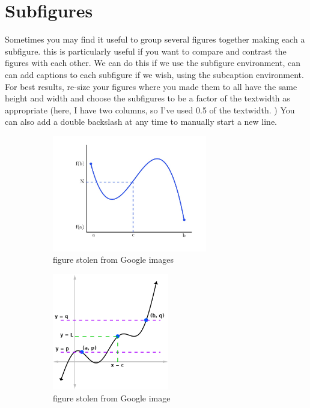 \documentclass[a4paper,11pt]{article}
\begin{document}
\section{Subfigures}

Sometimes you may find it useful to group several figures together making each a subfigure. this is particularly useful if you want to compare and contrast the figures with each other. We can do this if we use the subfigure environment, can can add captions to each subfigure if we wish, using the subcaption environment. For best results, re-size your figures where you made them to all have the same height and width and choose the subfigures to be a factor of the textwidth as appropriate (here, I have two columns, so I've used 0.5 of the textwidth. ) You can also add a double backslash at any time to manually start a new line.
%
\begin{figure}[htpb]
\begin{subfigure}{.5\textwidth}
  \centering
  \includegraphics[height=2in]{ivt}
  \caption{figure stolen from Google images} %
  \label{fig:IVTgoogleA}  		%
\end{subfigure}
\begin{subfigure}{.5\textwidth}
  \centering
  \includegraphics[height=2in]{IVT2}
  \caption{figure stolen from Google image} %
  \label{fig:IVTgoogleB}  		%
\end{subfigure}
\begin{subfigure}{.5\textwidth}

\end{subfigure}
\end{figure}
\end{document}
